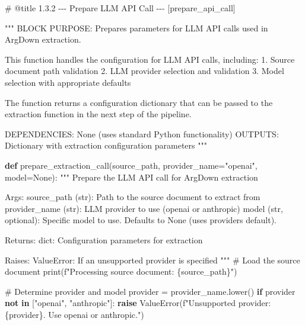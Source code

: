 \documentclass[
  11pt,
  letterpaper,
]{book}
\newenvironment{Shaded}{\begin{snugshade}}{\end{snugshade}}
\newcommand{\BuiltInTok}[1]{\textcolor[rgb]{0.00,0.23,0.31}{#1}}
\newcommand{\CommentTok}[1]{\textcolor[rgb]{0.37,0.37,0.37}{#1}}
\newcommand{\ControlFlowTok}[1]{\textcolor[rgb]{0.00,0.23,0.31}{\textbf{#1}}}
\newcommand{\KeywordTok}[1]{\textcolor[rgb]{0.00,0.23,0.31}{\textbf{#1}}}
\newcommand{\NormalTok}[1]{\textcolor[rgb]{0.00,0.23,0.31}{#1}}
\newcommand{\OperatorTok}[1]{\textcolor[rgb]{0.37,0.37,0.37}{#1}}
\newcommand{\PreprocessorTok}[1]{\textcolor[rgb]{0.68,0.00,0.00}{#1}}
\newcommand{\SpecialCharTok}[1]{\textcolor[rgb]{0.37,0.37,0.37}{#1}}
\newcommand{\SpecialStringTok}[1]{\textcolor[rgb]{0.13,0.47,0.30}{#1}}
\newcommand{\StringTok}[1]{\textcolor[rgb]{0.13,0.47,0.30}{#1}}
\newcommand{\VariableTok}[1]{\textcolor[rgb]{0.07,0.07,0.07}{#1}}
\begin{document}
\label{prepare_api_call}
\begin{Shaded}
\begin{Highlighting}[]
\CommentTok{\# @title 1.3.2 {-}{-}{-} Prepare LLM API Call {-}{-}{-} [prepare\_api\_call]}

\CommentTok{"""}
\CommentTok{BLOCK PURPOSE: Prepares parameters for LLM API calls used in ArgDown extraction.}

\CommentTok{This function handles the configuration for LLM API calls, including:}
\CommentTok{1. Source document path validation}
\CommentTok{2. LLM provider selection and validation}
\CommentTok{3. Model selection with appropriate defaults}

\CommentTok{The function returns a configuration dictionary that can be passed to the}
\CommentTok{extraction function in the next step of the pipeline.}

\CommentTok{DEPENDENCIES: None (uses standard Python functionality)}
\CommentTok{OUTPUTS: Dictionary with extraction configuration parameters}
\CommentTok{"""}

\KeywordTok{def}\NormalTok{ prepare\_extraction\_call(source\_path, provider\_name}\OperatorTok{=}\StringTok{"openai"}\NormalTok{, model}\OperatorTok{=}\VariableTok{None}\NormalTok{):}
    \CommentTok{"""}
\CommentTok{    Prepare the LLM API call for ArgDown extraction}

\CommentTok{    Args:}
\CommentTok{        source\_path (str): Path to the source document to extract from}
\CommentTok{        provider\_name (str): LLM provider to use (\textquotesingle{}openai\textquotesingle{} or \textquotesingle{}anthropic\textquotesingle{})}
\CommentTok{        model (str, optional): Specific model to use. Defaults to None (uses provider\textquotesingle{}s default).}

\CommentTok{    Returns:}
\CommentTok{        dict: Configuration parameters for extraction}

\CommentTok{    Raises:}
\CommentTok{        ValueError: If an unsupported provider is specified}
\CommentTok{    """}
    \CommentTok{\# Load the source document}
    \BuiltInTok{print}\NormalTok{(}\SpecialStringTok{f"Processing source document: }\SpecialCharTok{\{}\NormalTok{source\_path}\SpecialCharTok{\}}\SpecialStringTok{"}\NormalTok{)}

    \CommentTok{\# Determine provider and model}
\NormalTok{    provider }\OperatorTok{=}\NormalTok{ provider\_name.lower()}
    \ControlFlowTok{if}\NormalTok{ provider }\KeywordTok{not} \KeywordTok{in}\NormalTok{ [}\StringTok{"openai"}\NormalTok{, }\StringTok{"anthropic"}\NormalTok{]:}
        \ControlFlowTok{raise} \PreprocessorTok{ValueError}\NormalTok{(}\SpecialStringTok{f"Unsupported provider: }\SpecialCharTok{\{}\NormalTok{provider}\SpecialCharTok{\}}\SpecialStringTok{. Use \textquotesingle{}openai\textquotesingle{} or \textquotesingle{}anthropic\textquotesingle{}."}\NormalTok{)}


\end{Highlighting}
\end{Shaded}
\end{document}
